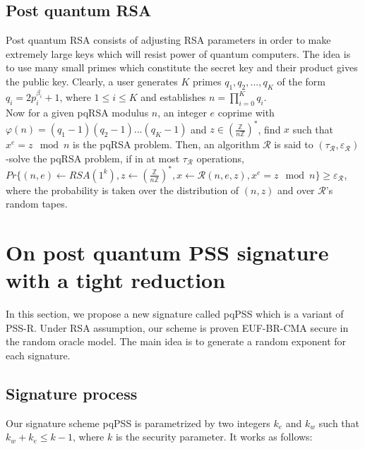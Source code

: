 \documentclass[a4paper,11pt]{article}
\begin{document}
\subsection{Post quantum RSA }\label{sec:one:3}
Post quantum RSA consists of adjusting RSA parameters in order to make extremely large keys which will resist power of quantum computers. The idea is to use many small primes which constitute the secret key and their product gives the public key. Clearly, a user generates $K$ primes $q_1,q_2,...,q_K$ of the form $q_i=2p_i^{\beta_i}+1$, where $ 1\leq i\leq K$ and establishes $n=\prod_{i=0}^{K}{q_i}$.\\
Now for a given pqRSA modulus  $n$, an integer $e$ coprime with $\varphi (n)=(q_1-1)(q_2-1)...(q_K-1)$ and $z \in (\frac{\mathbb{Z}}{n\mathbb{Z}})^{*}$, find $x$ such that $x^{e} = z  \mod n$ is the pqRSA problem. Then, an algorithm $\mathcal{R}$ is said to $(\tau_{\mathcal{R}} , \varepsilon_{\mathcal{R}} )$-solve the pqRSA
problem, if in at most $\tau_{\mathcal{R}}$ operations, $Pr \lbrace (n,e) \leftarrow RSA(1^{k} ), z \leftarrow (\frac{\mathbb{Z}}{n\mathbb{Z}})^{*} , x \leftarrow \mathcal{R}(n, e, z), x^{e} = z \mod n\rbrace \geq \varepsilon_{\mathcal{R}} $, where the probability is taken over the distribution of $(n, z)$ and over $\mathcal{\mathcal{R}}$'s  random tapes.


\section{On post quantum PSS signature with a tight reduction}\label{sec:two}

In this section,  we propose a new signature called pqPSS which is a variant of PSS-R. Under RSA
assumption, our scheme is proven EUF-BR-CMA secure in the random oracle model. The main idea is to generate a random exponent for each signature.

\subsection{Signature process}\label{sec:two:1}
Our signature scheme pqPSS is parametrized by two integers $k_e$ and $k_w$ such that $k_w+k_e \leq k-1$, where $k$ is the security parameter. It works as follows:
 \vspace{0.2cm}
\end{document}
